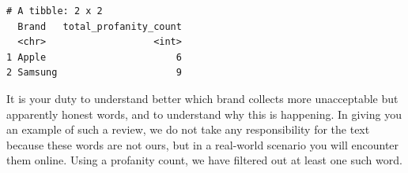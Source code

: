 \begin{verbatim}
# A tibble: 2 x 2
  Brand   total_profanity_count
  <chr>                   <int>
1 Apple                       6
2 Samsung                     9
\end{verbatim}

It is your duty to understand better which brand collects more
unacceptable but apparently honest words, and to understand why this
is happening. In giving you an example of such a review, we do not take any
responsibility for the text because these words are not ours,
but in a real-world scenario you will encounter them online. Using a profanity count, we
have filtered out at least one such word.

\begin{Shaded}
\begin{Highlighting}[]
\OtherTok{\textless{}{-}}\SpecialCharTok{\%\textgreater{}\%}
   \NormalTok{) }\SpecialCharTok{\%\textgreater{}\%}
  \SpecialCharTok{\textgreater{}} \NormalTok{) }\SpecialCharTok{\%\textgreater{}\%}
  \SpecialCharTok{\%\textgreater{}\%}
  \SpecialCharTok{\%\textgreater{}\%}
  \NormalTok{(}\NormalTok{)}

 \NormalTok{)  }\SpecialCharTok{\%\textgreater{}\%}
  \NormalTok{(} \NormalTok{) }\SpecialCharTok{\%\textgreater{}\%}
  \NormalTok{(}\NormalTok{, } \NormalTok{) }\SpecialCharTok{\%\textgreater{}\%}   
  \NormalTok{(}\NormalTok{, } \NormalTok{) }\SpecialCharTok{\%\textgreater{}\%}    
  \NormalTok{(}\NormalTok{, } \NormalTok{)  }
\end{Highlighting}
\end{Shaded}

